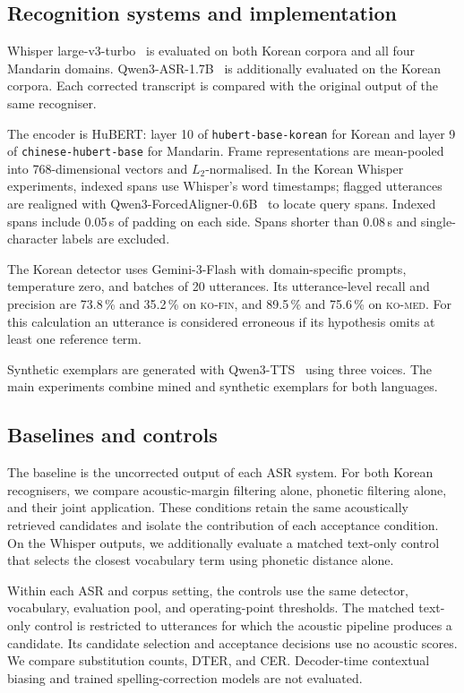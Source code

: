 \documentclass{article}
\newcommand{\corpA}{\textsc{ko-fin}}
\newcommand{\corpB}{\textsc{ko-med}}
\begin{document}
\subsection{Recognition systems and implementation}

Whisper large-v3-turbo~\cite{radford2023robust} is evaluated on both Korean corpora and all four Mandarin domains. Qwen3-ASR-1.7B~\cite{qwen2026asr} is additionally evaluated on the Korean corpora. Each corrected transcript is compared with the original output of the same recogniser.

The encoder is HuBERT: layer 10 of \texttt{hubert-base-korean} for Korean and layer 9 of \texttt{chinese-hubert-base} for Mandarin. Frame representations are mean-pooled into 768-dimensional vectors and $L_2$-normalised. In the Korean Whisper experiments, indexed spans use Whisper's word timestamps; flagged utterances are realigned with Qwen3-ForcedAligner-0.6B~\cite{qwen2026asr} to locate query spans. Indexed spans include 0.05\,s of padding on each side. Spans shorter than 0.08\,s and single-character labels are excluded.

The Korean detector uses Gemini-3-Flash with domain-specific prompts, temperature zero, and batches of 20 utterances. Its utterance-level recall and precision are 73.8\,\% and 35.2\,\% on \corpA{}, and 89.5\,\% and 75.6\,\% on \corpB{}. For this calculation an utterance is considered erroneous if its hypothesis omits at least one reference term.

Synthetic exemplars are generated with Qwen3-TTS~\cite{qwen2026tts} using three voices. The main experiments combine mined and synthetic exemplars for both languages.

\subsection{Baselines and controls}


The baseline is the uncorrected output of each ASR system. For both Korean recognisers, we compare acoustic-margin filtering alone, phonetic filtering alone, and their joint application. These conditions retain the same acoustically retrieved candidates and isolate the contribution of each acceptance condition. On the Whisper outputs, we additionally evaluate a matched text-only control that selects the closest vocabulary term using phonetic distance alone.

Within each ASR and corpus setting, the controls use the same detector, vocabulary, evaluation pool, and operating-point thresholds. The matched text-only control is restricted to utterances for which the acoustic pipeline produces a candidate. Its candidate selection and acceptance decisions use no acoustic scores. We compare substitution counts, DTER, and CER. Decoder-time contextual biasing and trained spelling-correction models are not evaluated.
\end{document}
